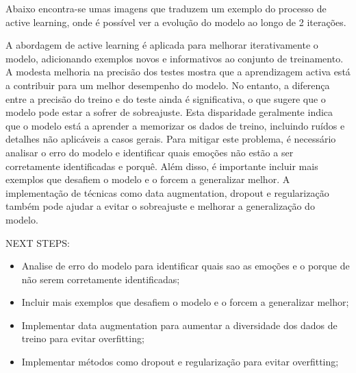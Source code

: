 Abaixo encontra-se umas imagens que traduzem um exemplo do processo de active learning, onde é possível ver a evolução do modelo ao longo de 2 iterações. 



A abordagem de active learning é aplicada para melhorar iterativamente o modelo, adicionando exemplos novos e informativos ao conjunto de treinamento. A modesta melhoria na precisão dos testes mostra que a aprendizagem activa está a contribuir para um melhor desempenho do modelo. No entanto, a diferença entre a precisão do treino e do teste ainda é significativa, o que sugere que o modelo pode estar a sofrer de sobreajuste. Esta disparidade geralmente indica que o modelo está a aprender a memorizar os dados de treino, incluindo ruídos e detalhes não aplicáveis ​​a casos gerais. Para mitigar este problema, é necessário analisar o erro do modelo e identificar quais emoções não estão a ser corretamente identificadas e porquê. Além disso, é importante incluir mais exemplos que desafiem o modelo e o forcem a generalizar melhor. A implementação de técnicas como data augmentation, dropout e regularização também pode ajudar a evitar o sobreajuste e melhorar a generalização do modelo.


NEXT STEPS:
\begin{itemize}
    \item Analise de erro do modelo para identificar quais sao as emoções e o porque de não serem corretamente identificadas;
    \item Incluir mais exemplos que desafiem o modelo e o forcem a generalizar melhor;
    \item Implementar data augmentation para aumentar a diversidade dos dados de treino para evitar overfitting;
    \item Implementar métodos como dropout e regularização para evitar overfitting;
\end{itemize}